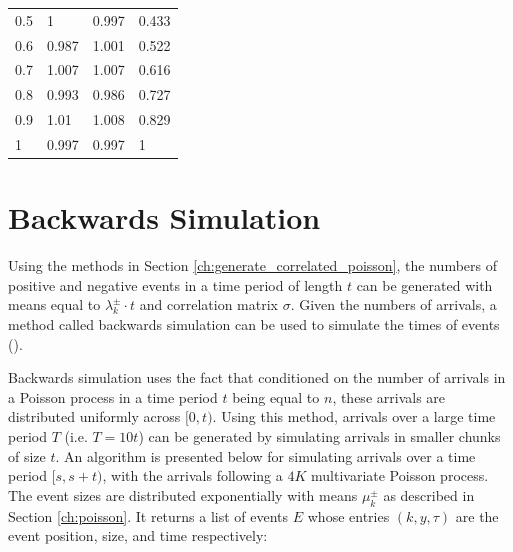 \begin{table}
\begin{tabular}{l|l|l|l}
0.5                 & 1                               & 0.997                           & 0.433               \\
0.6                 & 0.987                           & 1.001                           & 0.522               \\
0.7                 & 1.007                           & 1.007                           & 0.616               \\
0.8                 & 0.993                           & 0.986                           & 0.727               \\
0.9                 & 1.01                            & 1.008                           & 0.829               \\
1                   & 0.997                           & 0.997                           & 1                  
\end{tabular}
\end{table}

\section{Backwards Simulation} \label{ch:backwards_simulation}

Using the methods in Section \ref{ch:generate_correlated_poisson}, the numbers of positive and negative events in a time period of length $t$ can be generated with means equal to $\lambda^{\pm}_k \cdot t$ and correlation matrix $\sigma$. Given the numbers of arrivals, a method called backwards simulation can be used to simulate the times of events (\cite{A7}). 

Backwards simulation uses the fact that conditioned on the number of arrivals in a Poisson process in a time period $t$ being equal to $n$, these arrivals are distributed uniformly across $[0,t)$. Using this method, arrivals over a large time period $T$ (i.e. $T = 10t$) can be generated by simulating arrivals in smaller chunks of size $t$. An algorithm is presented below for simulating arrivals over a time period $[s,s+t)$, with the arrivals following a $4K$ multivariate Poisson process. The event sizes are distributed exponentially with means $\mu^{\pm}_k$ as described in Section \ref{ch:poisson}. It returns a list of events $E$ whose entries $(k,y,\tau)$ are the event position, size, and time respectively:
\newline

